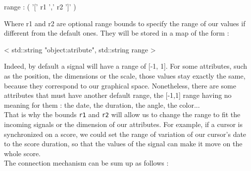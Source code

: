 \documentclass[a4paper]{article}
\newcommand{\OSC}[1]		{\texttt{#1}}
\begin{document}
\begin{rail}
range : ( '[' r1 ',' r2 ']' )
\end{rail}

Where r1 and r2 are optional range bounds to specify the range of our values if different from the default ones. They will be stored in a map of the form : 
\begin{center}
{ < {\color{Violet}std::string} "object:atribute", {\color{Violet}std::string} range >}
\end{center}

Indeed, by default a signal will have a range of [-1, 1]. For some attributes, such as the position, the dimensions or the scale, those values stay exactly the same, because they correspond to our graphical space. Nonetheless, there are some attributes that must have another default range, the [-1,1] range having no meaning for them : the date, the duration, the angle, the color...
\\

That is why the bounds \OSC{r1} and \OSC{r2} will allow us to change the range to fit the incoming signals or the dimension of our attributes. For example, if a cursor is synchronized on a score, we could set the range of variation of our cursor's date to the score duration, so that the values of the signal can make it move on the whole score.
\\

The connection mechanism can be sum up as follows :
\end{document}
